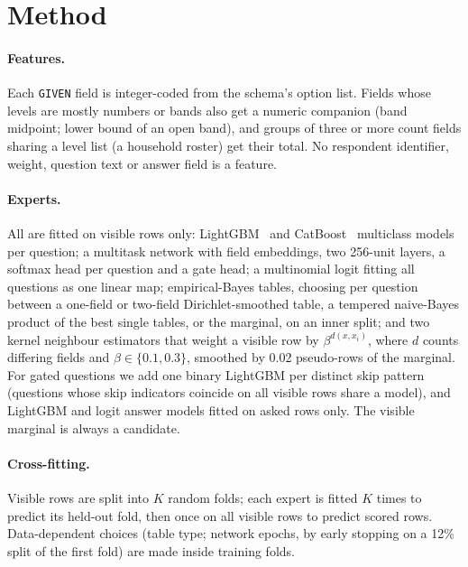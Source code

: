 \documentclass[10pt]{article}
\begin{document}
\section{Method}
\label{sec:method}

\paragraph{Features.} Each \texttt{GIVEN} field is integer-coded from the schema's option list. Fields whose levels are mostly numbers or bands also get a numeric companion (band midpoint; lower bound of an open band), and groups of three or more count fields sharing a level list (a household roster) get their total. No respondent identifier, weight, question text or answer field is a feature.

\paragraph{Experts.} All are fitted on visible rows only: LightGBM~\citep{ke2017lightgbm} and CatBoost~\citep{prokhorenkova2018catboost} multiclass models per question; a multitask network with field embeddings, two 256-unit layers, a softmax head per question and a gate head; a multinomial logit fitting all questions as one linear map; empirical-Bayes tables, choosing per question between a one-field or two-field Dirichlet-smoothed table, a tempered naive-Bayes product of the best single tables, or the marginal, on an inner split; and two kernel neighbour estimators that weight a visible row by $\beta^{d(x,x_i)}$, where $d$ counts differing fields and $\beta\in\{0.1,0.3\}$, smoothed by 0.02 pseudo-rows of the marginal. For gated questions we add one binary LightGBM per distinct skip pattern (questions whose skip indicators coincide on all visible rows share a model), and LightGBM and logit answer models fitted on asked rows only. The visible marginal is always a candidate.

\paragraph{Cross-fitting.} Visible rows are split into $K$ random folds; each expert is fitted $K$ times to predict its held-out fold, then once on all visible rows to predict scored rows. Data-dependent choices (table type; network epochs, by early stopping on a 12\% split of the first fold) are made inside training folds.
\end{document}
